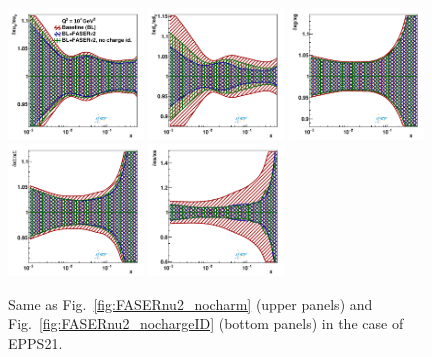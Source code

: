 \begin{figure}[htbp]
\includegraphics[width=0.32\textwidth]{plots/nuclear_fasernu2/nochargediscrimination/statOnly_FASERv2_q2_10000_pdf_uv_ratio.pdf}
\includegraphics[width=0.32\textwidth]{plots/nuclear_fasernu2/nochargediscrimination/statOnly_FASERv2_q2_10000_pdf_dv_ratio.pdf}
\includegraphics[width=0.32\textwidth]{plots/nuclear_fasernu2/nochargediscrimination/statOnly_FASERv2_q2_10000_pdf_g_ratio.pdf}\\
\includegraphics[width=0.32\textwidth]{plots/nuclear_fasernu2/nochargediscrimination/statOnly_FASERv2_q2_10000_pdf_Sea_ratio.pdf}
\includegraphics[width=0.32\textwidth]{plots/nuclear_fasernu2/nochargediscrimination/statOnly_FASERv2_q2_10000_pdf_s_ratio.pdf}
\caption{Same as Fig.~\ref{fig:FASERnu2_nocharm} (upper panels)
  and  Fig.~\ref{fig:FASERnu2_nochargeID} (bottom panels) in the case of EPPS21.
}
\label{fig:EPPS21_nochargeID}
\end{figure}


